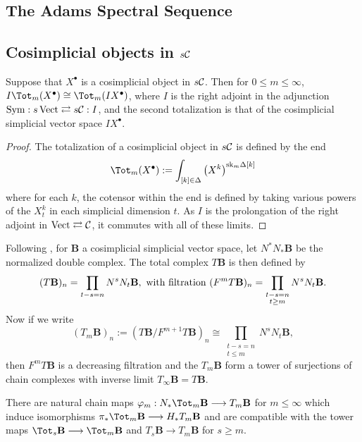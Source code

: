 \documentclass[10pt]{article}
\newcommand{\Comm}{\calC}
\begin{document}
\begin{TotalisationInSAlg}
\section{The Adams Spectral Sequence}
\subsection{Cosimplicial objects in $s\Comm$}
\begin{prop}
Suppose that $X^\bullet$ is a cosimplicial object in $s\Comm$. Then for $0\leq m\leq\infty$, $I\Tot_m(X^\bullet)\cong\Tot_m(IX^\bullet)$, where $I$ is the right adjoint in the adjunction $\textup{Sym}:s\Vect\rightleftarrows s\Comm:I$, and the second totalization is that of the cosimplicial simplicial vector space $IX^\bullet$.
\end{prop}
\begin{proof}
The totalization of a cosimplicial object in $s\Comm$ is defined by the end
\[\Tot_m(X^\bullet):= \int_{[k]\in\Delta}\left(X^k\right)^{\textup{sk}_m\Delta[k]}\]
where for each $k$, the cotensor within the end is defined by taking various powers of the $X^k_t$ in each simplicial dimension $t$. As $I$ is the prolongation of the right adjoint in $\Vect\rightleftarrows\Comm$, it commutes with all of these limits.
\end{proof}
Following \cite{BousfieldHSSCS.pdf}, for $\textbf{B}$ a cosimplicial simplicial vector space, let $N^*N_*\textbf{B}$ be the normalized double complex. The total complex $T\textbf{B}$ is then defined by
\[(T\textbf{B})_n=\prod_{t-s=n}N^sN_t\textbf{B},\ \textup{with filtration }(F^mT\textbf{B})_n=\prod_{\substack{t-s=n\\t\geq m}}N^sN_t\textbf{B}.\]
Now if we write
\[(T_m\textbf{B})_n:=(T\textbf{B}/F^{m+1} T\textbf{B})_n\cong\prod_{\substack{t-s=n\\t\leq m}}N^sN_t\textbf{B}, \]
then $F^mT\textbf{B}$ is a decreasing filtration and the $T_m\textbf{B}$ form a tower of surjections of chain complexes with inverse limit $T_\infty\textbf{B}=T\textbf{B}$. 
\begin{lem}
There are natural chain maps $\phi_m:N_*\Tot_m\textbf{B}\to T_m\textbf{B}$ for $m\leq\infty$ which induce isomorphisms $\pi_*\Tot_m\textbf{B}\to H_*T_m\textbf{B}$ and are compatible with the tower maps $\Tot_{s}\textbf{B}\to\Tot_m\textbf{B}$ and $T_{s}\textbf{B}\to T_m\textbf{B}$ for $s\geq m$.
\end{lem}
\begin{cor}

\end{cor}
\end{TotalisationInSAlg}
\end{document}
